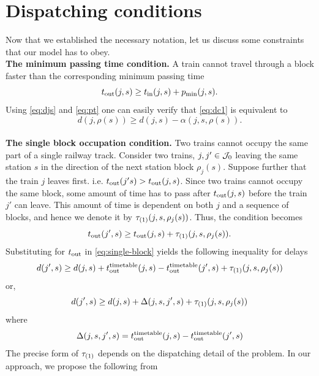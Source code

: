 \section{Dispatching conditions}
Now that we established the necessary notation, let us discuss some constraints that our model has to obey.\\
\textbf{The minimum passing time condition.} A train cannot travel through a block faster than the corresponding minimum passing time
\begin{equation}
	\label{eq:dc1}
	t_\text{out}(j, s) \ge t_\text{in}(j, s) + p_\text{min}(j, s).
\end{equation}
Using \eqref{eq:djs} and \eqref{eq:pt} one can easily verify that \eqref{eq:dc1} is equivalent to
\begin{equation}
  \label{eq:passingtime}
	d(j, \rho(s)) \ge d(j, s) - \alpha(j, s, \rho(s)).
\end{equation}\\
\textbf{The single block occupation condition.} Two trains cannot occupy the same part of a single
railway track. Consider two trains, $j, j' \in \mathcal{J}_0$ leaving the same station $s$ in the direction
of the next station block $\rho_j(s)$. Suppose further that the train $j$ leaves first. i.e.
$t_\text{out}(j's) > t_\text{out}(j, s)$. Since two trains cannot occupy the same block, some amount of time has
to pass after $t_\text{out}(j, s)$ before the train $j'$ can leave. This amount of time is dependent on
both $j$ and a sequence of blocks, and hence we denote it by $\tau_{(1)}(j, s, \rho_j(s))$. Thus, the
condition becomes
\begin{equation}
	\label{eq:single-block}
	t_\text{out}(j', s) \ge t_\text{out}(j, s) + \tau_{(1)}(j, s, \rho_j(s)).
\end{equation}
Substituting for $t_\text{out}$ in \eqref{eq:single-block} yields the following inequality for delays
\begin{equation}
	\label{eq:single-block-delays}
	d(j', s) \ge d(j, s) + t_\text{out}^\text{timetable}(j, s) - t_\text{out}^\text{timetable}(j', s) + \tau_{(1)}(j, s, \rho_j(s))
\end{equation}
or,
\begin{equation}
	d(j', s) \ge d(j, s) + \Delta(j, s, j', s) + \tau_{(1)}(j, s, \rho_j(s))
\end{equation}
where
\begin{equation}
	\label{eq:delta}
	\Delta(j, s, j', s) = t_\text{out}^\text{timetable}(j, s) - t_\text{out}^\text{timetable}(j', s)
\end{equation}
The precise form of $\tau_{(1)}$ depends on the dispatching detail of the problem. In our approach, we
propose the following from

